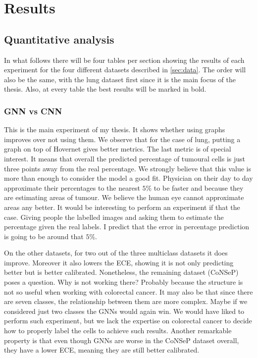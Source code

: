 \chapter{Results}
\section{Quantitative analysis}\label{sec:results}

In what follows there will be four tables per section showing the results of each experiment for the four different datasets described in \autoref{sec:data}. The order will also be the same, with the lung dataset first since it is the main focus of the thesis. Also, at every table the best results will be marked in bold.

\subsection{GNN vs CNN}

This is the main experiment of my thesis. It shows whether using graphs improves over not using them. We observe that for the case of lung, putting a graph on top of Hovernet gives better metrics. The last metric is of special interest. It means that overall the predicted percentage of tumoural cells is just three points away from the real percentage. We strongly believe that this value is more than enough to consider the model a good fit. Physician on their day to day approximate their percentages to the nearest $5\%$ to be faster and because they are estimating areas of tumour. We believe the human eye cannot approximate areas any better. It would be interesting to perform an experiment if that the case. Giving people the labelled images and asking them to estimate the percentage given the real labels. I predict that the error in percentage prediction is going to be around that $5\%$.

On the other datasets, for two out of the three multiclass datasets it does improve. Moreover it also lowers the ECE, showing it is not only predicting better but is better calibrated. Nonetheless, the remaining dataset (CoNSeP) poses a question. Why is not working there? Probably because the structure is not so useful when working with colorectal cancer. It may also be that since there are seven classes, the relationship between them are more complex. Maybe if we considered just two classes the GNNs would again win. We would have liked to perform such experiment, but we lack the expertise on colorectal cancer to decide how to properly label the cells to achieve such results. Another remarkable property is that even though GNNs are worse in the CoNSeP dataset overall, they have a lower ECE, meaning they are still better calibrated.

